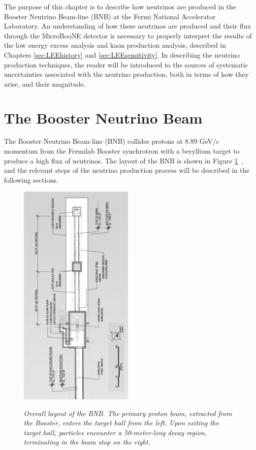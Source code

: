 The purpose of this chapter is to describe how neutrinos are produced in the Booster Neutrino Beam-line (BNB) at the Fermi National Accelerator Laboratory. An understanding of how these neutrinos are produced and their flux through the MicroBooNE detector is necessary to properly interpret the results of the low energy excess analysis and kaon production analysis, described in Chapters \ref{sec:LEEhistory} and \ref{sec:LEEsensitivity}. In describing the neutrino production techniques, the reader will be introduced to the sources of systematic uncertainties associated with the neutrino production, both in terms of how they arise, and their magnitude. 

\section{The Booster Neutrino Beam}\label{beam_descript_section}
The Booster Neutrino Beam-line (BNB) collides protons at 8.89 GeV/c momentum from the Fermilab Booster synchrotron with a beryllium target to produce a high flux of neutrinos. The layout of the BNB is shown in Figure \ref{BNB_layout_schematic}~\cite{MBFluxPaper}, and the relevant steps of the neutrino production process will be described in the following sections.

\begin{figure}[ht!]
\centering
	\includegraphics[width=0.5\textwidth]{Figures/BNB_layout_schematic.png} \\
\caption{\textit{Overall layout of the BNB. The primary proton beam, extracted from the Booster, enters the target hall from the left. Upon exiting the target hall, particles encounter a 50-meter-long decay region, terminating in the beam stop on the right.}}\label{BNB_layout_schematic}
\end{figure}


